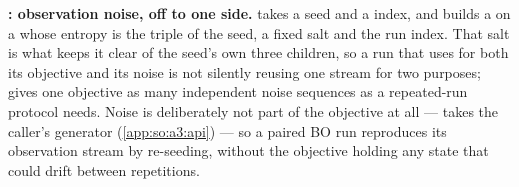 \textbf{: observation noise, off to one side.}
 takes a seed and a
 index, and builds a  on a
 whose entropy is the triple of the seed, a fixed salt and
the run index. That salt is what
keeps it clear of the seed's own three children, so a run that uses
 for both its objective and its noise is not silently reusing one
stream for two purposes;  gives one objective as many independent
noise sequences as a repeated-run protocol needs. Noise is deliberately not
part of the objective at all ---  takes the caller's generator
(\ref{app:so:a3:api}) --- so a paired BO run reproduces its observation stream
by re-seeding, without the objective holding any state that could drift between
repetitions.


